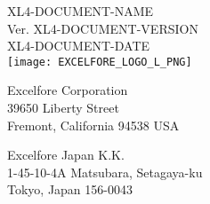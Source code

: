 \documentclass[oneside]{book}
\newcommand{\+}{\discretionary{\mbox{\scriptsize$\hookleftarrow$}}{}{}}
\newcommand{\clearemptydoublepage}{%
  \newpage{\pagestyle{empty}\cleardoublepage}%
}
\begin{document}
\renewcommand{\contentsname}{Table of Contents}
\hypersetup{pageanchor=false,
             bookmarks=true,
             bookmarksnumbered=true,
             pdfencoding=unicode
            }
\begin{titlepage}
\vspace*{7cm}
\begin{center}%
{\LARGE XL4-DOCUMENT-NAME}\\
\vspace*{1cm}
{\normalsize Ver. XL4-DOCUMENT-VERSION}\\
{\normalsize XL4-DOCUMENT-DATE}\\
\vspace*{5cm}
{\texttt{[image: EXCELFORE\_LOGO\_L\_PNG]}}\\
\vspace*{2cm}
\end{center}
\begin{multicols}{2}
\begin{center}%
{\normalsize Excelfore Corporation}\\
\vspace*{0.2cm}
{\normalsize 39650 Liberty Street}\\
\vspace*{0.2cm}
{\normalsize Fremont, California 94538 USA}\\
\end{center}
\columnbreak
\begin{center}%
{\normalsize Excelfore Japan K.K.}\\
\vspace*{0.2cm}
{\normalsize 1-45-10-4A Matsubara, Setagaya-ku}\\
\vspace*{0.2cm}
{\normalsize Tokyo, Japan 156-0043}\\
\end{center}
\end{multicols}
\end{titlepage}
\clearemptydoublepage
\tableofcontents
\begingroup
\let\clearpage\relax
\listoffigures
\listoftables
\endgroup
\clearemptydoublepage
{}
\hypersetup{pageanchor=true}

\end{document}
